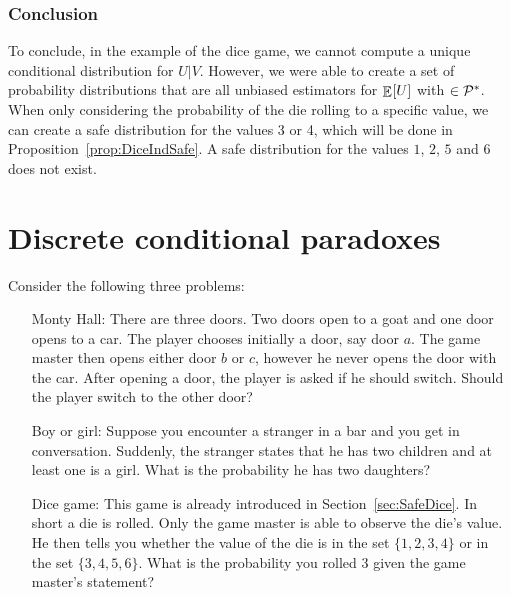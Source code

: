 \documentclass[a4paper]{report}
\theoremstyle{plain}
\theoremstyle{definition}
\theoremstyle{remark}
\numberwithin{equation}{chapter}
\let\P\relax
\DeclareMathOperator{\P}{\mathbb{P}}
\DeclareMathOperator{\E}{\mathbb{E}}
\DeclareMathOperator{\1}{\mathbbm{1}}
\newcommand{\Pmod}{\mathcal{P}^*}
\begin{document}
\subsection{Conclusion}
To conclude, in the example of the dice game, we cannot compute a unique conditional distribution for $U|V$. However, we were able to create a set of probability distributions that are all unbiased estimators for $\E_{\P}[U]$ with $\P\in\Pmod$. When only considering the probability of the die rolling to a specific value, we can create a safe distribution for the values 3 or 4, which will be done in Proposition~\ref{prop:DiceIndSafe}. A safe distribution for the values $1$, $2$, $5$ and $6$ does not exist.

\chapter{Discrete conditional paradoxes}\label{chap:DiscPara}
Consider the following three problems:
\begin{enumerate}
    \item[Monty Hall:] There are three doors. Two doors open to a goat and one door opens to a car. The player chooses initially a door, say door $a$. The game master then opens either door $b$ or $c$, however he never opens the door with the car. After opening a door, the player is asked if he should switch. Should the player switch to the other door?
    \item[Boy or girl:] Suppose you encounter a stranger in a bar and you get in conversation. Suddenly, the stranger states that he has two children and at least one is a girl. What is the probability he has two daughters?
    \item[Dice game:] This game is already introduced in Section~\ref{sec:SafeDice}. In short a die is rolled. Only the game master is able to observe the die's value. He then tells you whether the value of the die is in the set $\{1,2,3,4\}$ or in the set $\{3,4,5,6\}$. What is the probability you rolled $3$ given the game master's statement?
\end{enumerate}
\end{document}
